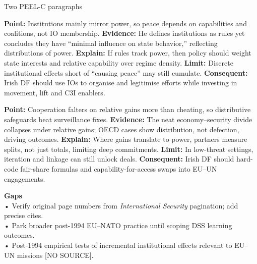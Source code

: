 Two PEEL-C paragraphs  

\textbf{Point:} Institutions mainly mirror power, so peace depends on capabilities and coalitions, not IO membership.  
\textbf{Evidence:} He defines institutions as rules yet concludes they have “minimal influence on state behavior,” reflecting distributions of power.  
\textbf{Explain:} If rules track power, then policy should weight state interests and relative capability over regime density.  
\textbf{Limit:} Discrete institutional effects short of “causing peace” may still cumulate.  
\textbf{Consequent:} Irish DF should use IOs to organise and legitimise efforts while investing in movement, lift and C3I enablers.  

\textbf{Point:} Cooperation falters on relative gains more than cheating, so distributive safeguards beat surveillance fixes.  
\textbf{Evidence:} The neat economy–security divide collapses under relative gains; OECD cases show distribution, not defection, driving outcomes.  
\textbf{Explain:} Where gains translate to power, partners measure splits, not just totals, limiting deep commitments.  
\textbf{Limit:} In low-threat settings, iteration and linkage can still unlock deals.  
\textbf{Consequent:} Irish DF should hard-code fair-share formulas and capability-for-access swaps into EU–UN engagements.  

\textbf{Gaps}\\  
• Verify original page numbers from \textit{International Security} pagination; add precise cites.\\  
• Park broader post-1994 EU–NATO practice until scoping DSS learning outcomes.\\  
• Post-1994 empirical tests of incremental institutional effects relevant to EU–UN missions [NO SOURCE].  

\parencite{MEARSHEIMER_2019}  


